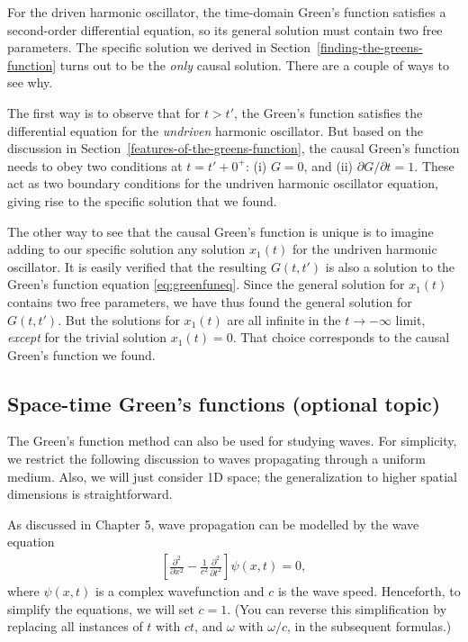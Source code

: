 \documentclass[10pt,a4paper]{article}
\begin{document}
For the driven harmonic oscillator, the time-domain Green's function
satisfies a second-order differential equation, so its general
solution must contain two free parameters.  The specific solution we
derived in Section~\ref{finding-the-greens-function} turns out to be
the \textit{only} causal solution. There are a couple of ways to see
why.

The first way is to observe that for $t > t'$, the Green's function
satisfies the differential equation for the \textit{undriven} harmonic
oscillator. But based on the discussion in
Section~\ref{features-of-the-greens-function}, the causal Green's
function needs to obey two conditions at $t = t' + 0^+$: (i) $G = 0$,
and (ii) $\partial G / \partial t = 1$. These act as two boundary
conditions for the undriven harmonic oscillator equation, giving rise
to the specific solution that we found.

The other way to see that the causal Green's function is unique is to
imagine adding to our specific solution any solution $x_1(t)$ for the
undriven harmonic oscillator.  It is easily verified that the
resulting $G(t,t')$ is also a solution to the Green's function
equation \eqref{eq:greenfuneq}. Since the general solution for
$x_1(t)$ contains two free parameters, we have thus found the general
solution for $G(t,t')$. But the solutions for $x_1(t)$ are all
infinite in the $t \rightarrow -\infty$ limit, \textit{except} for the
trivial solution $x_1(t) = 0$. That choice corresponds to the causal
Green's function we found.

\subsection{Space-time Green's functions (optional topic)}
\label{space-time-greens-functions}

The Green's function method can also be used for studying waves. For
simplicity, we restrict the following discussion to waves propagating
through a uniform medium. Also, we will just consider 1D space; the
generalization to higher spatial dimensions is straightforward.

As discussed in Chapter 5, wave propagation can be modelled by the
wave equation
\begin{align}
  \left[\frac{\partial^2}{\partial x^2} - \frac{1}{c^2} \frac{\partial^2}{\partial t^2} \right] \psi(x,t) = 0,
\end{align}
where $\psi(x,t)$ is a complex wavefunction and $c$ is the wave
speed. Henceforth, to simplify the equations, we will set $c = 1$.
(You can reverse this simplification by replacing all instances of $t$
with $c t$, and $\omega$ with $\omega/c$, in the subsequent formulas.)
\end{document}
